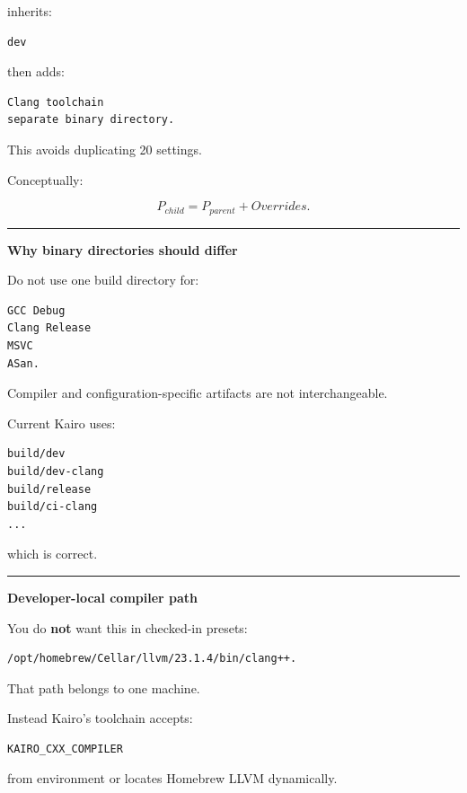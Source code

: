 inherits:

\begin{verbatim}
dev
\end{verbatim}

then adds:

\begin{verbatim}
Clang toolchain
separate binary directory.
\end{verbatim}

This avoids duplicating 20 settings.

Conceptually:

\[
P_{child}
=
P_{parent}
+
Overrides.
\]

\begin{center}\rule{0.5\linewidth}{0.5pt}\end{center}

\textbf{Why binary directories should differ}

Do not use one build directory for:

\begin{verbatim}
GCC Debug
Clang Release
MSVC
ASan.
\end{verbatim}

Compiler and configuration-specific artifacts are not interchangeable.

Current Kairo uses:

\begin{verbatim}
build/dev
build/dev-clang
build/release
build/ci-clang
...
\end{verbatim}

which is correct.

\begin{center}\rule{0.5\linewidth}{0.5pt}\end{center}

\textbf{Developer-local compiler path}

You do \textbf{not} want this in checked-in presets:

\begin{verbatim}
/opt/homebrew/Cellar/llvm/23.1.4/bin/clang++.
\end{verbatim}

That path belongs to one machine.

Instead Kairo's toolchain accepts:

\begin{verbatim}
KAIRO_CXX_COMPILER
\end{verbatim}

from environment or locates Homebrew LLVM dynamically.

